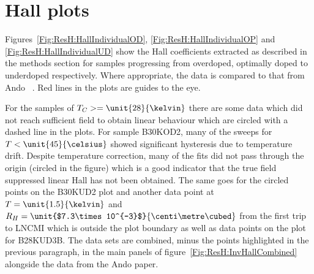 

\section{Hall plots}

Figures~\ref{Fig:ResH:HallIndividualOD}, \ref{Fig:ResH:HallIndividualOP} and \ref{Fig:ResH:HallIndividualUD} show the Hall coefficients extracted as described in the methods section for samples progressing from overdoped, optimally doped to underdoped respectively. Where appropriate, the data is compared to that from Ando \etal~\cite{Ando1999}. Red lines in the plots are guides to the eye.

For the samples of $T_C >= \unit{28}{\kelvin}$ there are some data which did not reach sufficient field to obtain linear behaviour which are circled with a dashed line in the plots. For sample B30KOD2, many of the sweeps for $T < \unit{45}{\celsius}$ showed significant hysteresis due to temperature drift. Despite temperature correction, many of the fits did not pass through the origin (circled in the figure) which is a good indicator that the true field suppressed linear Hall has not been obtained. The same goes for the circled points on the B30KUD2 plot and another data point at $T=\unit{1.5}{\kelvin}$ and $R_H = \unit{$7.3\times10^{-3}$}{\centi\metre\cubed}$ from the first trip to \ac{LNCMI} which is outside the plot boundary as well as data points on the plot for B28KUD3B. The data sets are combined, minus the points highlighted in the previous paragraph, in the main panels of figure~\ref{Fig:ResH:InvHallCombined} alongside the data from the Ando paper.

